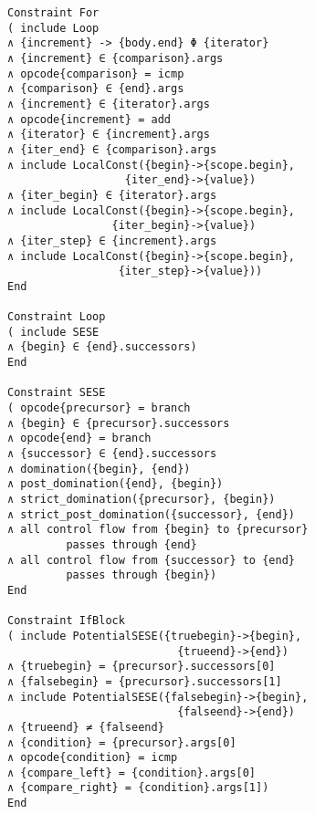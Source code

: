 \begin{figure}[p]
\begin{lstlisting}[language=CAnDL, firstnumber=88]
Constraint For
( include Loop
∧ {increment} -> {body.end} Φ {iterator}
∧ {increment} ∈ {comparison}.args
∧ opcode{comparison} = icmp
∧ {comparison} ∈ {end}.args
∧ {increment} ∈ {iterator}.args
∧ opcode{increment} = add
∧ {iterator} ∈ {increment}.args
∧ {iter_end} ∈ {comparison}.args
∧ include LocalConst({begin}->{scope.begin},
                  {iter_end}->{value})
∧ {iter_begin} ∈ {iterator}.args
∧ include LocalConst({begin}->{scope.begin},
                {iter_begin}->{value})
∧ {iter_step} ∈ {increment}.args
∧ include LocalConst({begin}->{scope.begin},
                 {iter_step}->{value}))
End

Constraint Loop
( include SESE
∧ {begin} ∈ {end}.successors)
End

Constraint SESE
( opcode{precursor} = branch
∧ {begin} ∈ {precursor}.successors
∧ opcode{end} = branch
∧ {successor} ∈ {end}.successors
∧ domination({begin}, {end})
∧ post_domination({end}, {begin})
∧ strict_domination({precursor}, {begin})
∧ strict_post_domination({successor}, {end})
∧ all control flow from {begin} to {precursor}
         passes through {end}
∧ all control flow from {successor} to {end}
         passes through {begin})
End

Constraint IfBlock
( include PotentialSESE({truebegin}->{begin},
                          {trueend}->{end})
∧ {truebegin} = {precursor}.successors[0]
∧ {falsebegin} = {precursor}.successors[1]
∧ include PotentialSESE({falsebegin}->{begin},
                          {falseend}->{end})
∧ {trueend} ≠ {falseend}
∧ {condition} = {precursor}.args[0]
∧ opcode{condition} = icmp
∧ {compare_left} = {condition}.args[0]
∧ {compare_right} = {condition}.args[1])
End
\end{lstlisting}
\end{figure}
